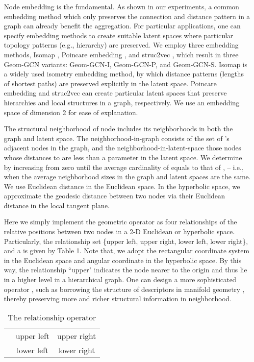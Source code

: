 \documentclass{article} \usepackage{iclr2020_conference,times}
\begin{document}
Node embedding is the fundamental. 
As shown in our experiments, a common embedding method which only preserves the connection and distance pattern in a graph can already benefit the aggregation. 
For particular applications, one can specify embedding methods to create suitable latent spaces where particular topology patterns (e.g., hierarchy) are preserved.
We employ three embedding methods, Isomap \citep{tenenbaum2000global}, Poincare embedding \citep{DBLP:conf/nips/NickelK17}, and struc2vec \citep{DBLP:conf/kdd/RibeiroSF17}, which result in three Geom-GCN variants: Geom-GCN-I, Geom-GCN-P, and Geom-GCN-S.
Isomap is a widely used isometry embedding method, by which distance patterns (lengths of shortest paths) are preserved explicitly in the latent space.
Poincare embedding and struc2vec can create particular latent spaces that preserve hierarchies and local structures in a graph, respectively.
We use an embedding space of dimension 2 for ease of explanation. 

The structural neighborhood  of node  includes its neighborhoods in both the graph and latent space.
The neighborhood-in-graph  consists of the set of 's adjacent nodes in the graph, and the neighborhood-in-latent-space  those nodes whose distances to  are less than a parameter  in the latent space.
We determine  by increasing  from zero until the average cardinality of  equals to that of , -- i.e., when the average neighborhood sizes in the graph and latent spaces are the same.
We use Euclidean distance in the Euclidean space.
In the hyperbolic space, we approximate the geodesic distance between two nodes via their Euclidean distance in the local tangent plane.

Here we simply implement the geometric operator  as four relationships of the relative positions between two nodes in a 2-D Euclidean or hyperbolic space. 
Particularly, the relationship set  \{upper left, upper right, lower left, lower right\}, and a  is given by Table \ref{tab:operator}.
Note that, we adopt the rectangular coordinate system in the Euclidean space and angular coordinate in the hyperbolic space.
By this way, the relationship ``upper" indicates the node nearer to the origin and thus lie in a higher level in a hierarchical graph.
One can design a more sophisticated operator , such as borrowing the structure of descriptors in manifold geometry \citep{kokkinos2012intrinsic,monti2017geometric}, thereby preserving more and richer structural information in neighborhood.

\begin{table}[h]
  \vspace{-2mm}
  \begin{center}
  \caption{The relationship operator}
  \vspace{-1mm}
  \label{tab:operator}
    \begin{tabular}{c|c|c}  
       &  & \\
      \hline
       & upper left &  upper right\\
       &  lower left &  lower right\\
    \end{tabular}
  \end{center}
\end{table}
\end{document}
